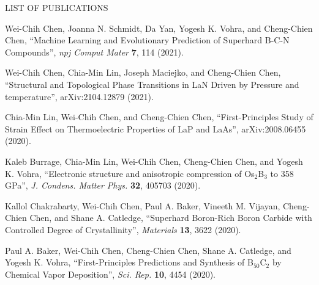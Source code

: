 	\pagebreak
	

	
	{\centering
		\vspace{0pt} \hspace{0pt} \par
	}
	{\centering
		\vspace{56pt} LIST OF PUBLICATIONS
	}
	{\centering\singlespacing
		
	    \par
	}
	{\centering
		\vspace{0pt} \hspace{0pt} \par
	}	
	\noindent Wei-Chih Chen, Joanna N. Schmidt, Da Yan, Yogesh K. Vohra, and Cheng-Chien Chen, “Machine Learning and Evolutionary Prediction of Superhard B-C-N Compounds”, {\it npj Comput Mater} {\bf 7}, 114 (2021).
	
	\vspace{12pt}

    \noindent Wei-Chih Chen, Chia-Min Lin, Joseph Maciejko, and Cheng-Chien Chen, “Structural and Topological Phase Transitions in LaN Driven by Pressure and temperature”, arXiv:2104.12879 (2021).

	\vspace{12pt}
	
	\noindent Chia-Min Lin, Wei-Chih Chen, and Cheng-Chien Chen, “First-Principles Study of Strain Effect on Thermoelectric Properties of LaP and LaAs”, arXiv:2008.06455 (2020).

	\vspace{12pt}

	\noindent Kaleb Burrage, Chia-Min Lin, Wei-Chih Chen, Cheng-Chien Chen, and Yogesh K. Vohra, “Electronic structure and anisotropic compression of Os$_2$B$_3$ to 358 GPa”, {\it J. Condens. Matter Phys.} {\bf 32}, 405703 (2020).
	
	\vspace{12pt}
	
    \noindent Kallol Chakrabarty, Wei-Chih Chen, Paul A. Baker, Vineeth M. Vijayan, Cheng-Chien Chen, and Shane A. Catledge, “Superhard Boron-Rich Boron Carbide with Controlled Degree of Crystallinity”, {\it Materials} {\bf 13}, 3622 (2020).
    
	\vspace{12pt}
    
    \noindent Paul A. Baker, Wei-Chih Chen, Cheng-Chien Chen, Shane A. Catledge, and Yogesh K. Vohra, “First-Principles Predictions and Synthesis of B$_{50}$C$_2$ by Chemical Vapor Deposition”, {\it Sci. Rep.} {\bf 10}, 4454 (2020).


